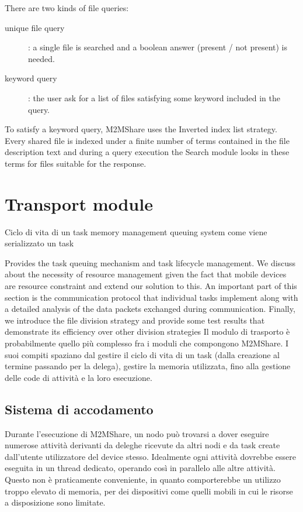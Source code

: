 There are two kinds of file queries: 

\begin{description}
\item[unique file query]: a single file is searched and a boolean answer (present / not present) is needed.
\item[keyword query]: the user ask for a list of files satisfying some keyword included in the query.
\end{description}

To satisfy a keyword query, M2MShare uses the Inverted index list strategy. Every shared file is indexed under a finite number of terms contained in the file description text and during a query execution the Search module looks in these terms for files suitable for the response.


\section{Transport module}
Ciclo di vita di un task
memory management
queuing system
come viene serializzato un task


Provides the task queuing mechanism and task lifecycle management. We discuss about the necessity of resource management given the fact that mobile devices are resource constraint and extend our solution to this. An important part of this section is the communication protocol that individual tasks implement along with a detailed analysis of the data packets exchanged during communication. Finally, we introduce the file division strategy and provide some test results that demonstrate its efficiency over other division strategies
Il modulo di trasporto è probabilmente quello più complesso fra i moduli che compongono M2MShare. I suoi compiti spaziano dal gestire il ciclo di vita di un task (dalla creazione al termine passando per la delega), gestire la memoria utilizzata, fino alla gestione delle code di attività e la loro esecuzione.

\subsection{Sistema di accodamento}
Durante l'esecuzione di M2MShare, un nodo può trovarsi a dover eseguire numerose attività derivanti da deleghe ricevute da altri nodi e da task create dall'utente utilizzatore del device stesso. Idealmente ogni attività dovrebbe essere eseguita in un thread dedicato, operando così in parallelo alle altre attività. Questo non è praticamente conveniente, in quanto comporterebbe un utilizzo troppo elevato di memoria, per dei dispositivi come quelli mobili in cui le risorse a disposizione sono limitate. 
\\

